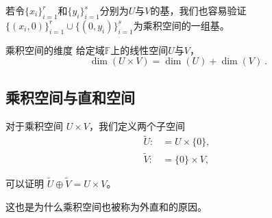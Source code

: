 若令$\{x_i\}^r_{i=1}$和$\{y_i\}^s_{i=1}$分别为$U$与$V$的基，我们也容易验证$\{(x_i, 0)\}^r_{i=1}\cup \{(0, y_i)\}^s_{i=1}$为乘积空间的一组基。

\begin{theorem}{乘积空间的维度}
给定域$\mathbb F $上的线性空间$U$与$V$，
$$
\dim(U \times V) = \dim(U) + \dim(V)~.
$$
\end{theorem}

\subsection{乘积空间与直和空间}\label{sub_lnal06_1}

对于乘积空间 $U \times V$，我们定义两个子空间
$$
\begin{aligned}
\tilde{U}: &= U \times \{0\} , \\
\tilde{V}: &= \{0\} \times V ,
\end{aligned}~
$$

可以证明 $\tilde{U} \oplus \tilde{V} = U \times V$。

这也是为什么乘积空间也被称为外直和的原因。

